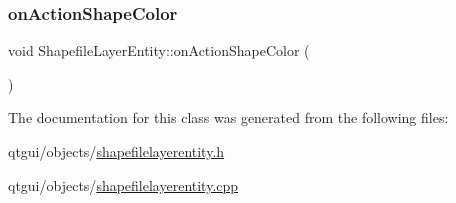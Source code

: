 \mbox{\label{classobjecttree_1_1_shapefile_layer_entity_a490911b1ac9944424ccd7ddc8a530573}} 
\subsubsection{\texorpdfstring{onActionShapeColor}{onActionShapeColor}}
{\footnotesize\ttfamily void Shapefile\+Layer\+Entity\+::on\+Action\+Shape\+Color (\begin{DoxyParamCaption}{ }\end{DoxyParamCaption})\hspace{0.3cm}{\ttfamily [slot]}}



The documentation for this class was generated from the following files\+:\begin{DoxyCompactItemize}
\item 
qtgui/objects/\mbox{\hyperlink{shapefilelayerentity_8h}{shapefilelayerentity.\+h}}\item 
qtgui/objects/\mbox{\hyperlink{shapefilelayerentity_8cpp}{shapefilelayerentity.\+cpp}}\end{DoxyCompactItemize}
